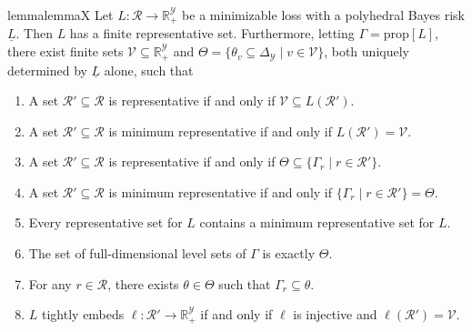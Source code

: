 \documentclass[twoside,11pt]{article}
\newcommand{\reals}{\mathbb{R}}
\newcommand{\prop}[1]{\mathrm{prop}[#1]}
\newcommand{\simplex}{\Delta_\Y}
\newcommand{\R}{\mathcal{R}}
\newcommand{\V}{\mathcal{V}}
\newcommand{\Y}{\mathcal{Y}}
\newcommand{\risk}[1]{\underline{#1}}
\begin{document}
\begin{restatable}{lemma}{lemmaX}\label{lem:X}
  Let $L: \R \to \reals^\Y_+$ be a minimizable loss with a polyhedral Bayes risk $\risk L$.
  Then $L$ has a finite representative set.
  Furthermore, letting $\Gamma = \prop{L}$, there exist finite sets
  $\V \subseteq \reals^\Y_+$ and
  $\Theta = \{\theta_v \subseteq \simplex \mid v\in\V\}$,
  both uniquely determined by $\risk{L}$ alone,
  such that
  \begin{enumerate}
  \item A set $\R'\subseteq\R$ is representative if and only if $\V \subseteq L(\R')$.\label{item:X-rep-V}
  \item A set $\R'\subseteq\R$ is minimum representative if and only if $L(\R') = \V$.\label{item:X-min-V}
  \item A set $\R'\subseteq\R$ is representative if and only if $\Theta \subseteq \{\Gamma_r \mid r \in \R'\}$.\label{item:X-rep-Theta}
  \item A set $\R'\subseteq\R$ is minimum representative if and only if $\{\Gamma_r \mid r \in \R'\} = \Theta$.\label{item:X-min-Theta}
  \item Every representative set for $L$ contains a minimum representative set for $L$.\label{item:X-rep-contain-min}
  \item The set of full-dimensional level sets of $\Gamma$ is exactly $\Theta$.\label{item:X-full-dim}
  \item For any $r \in \R$, there exists $\theta \in \Theta$ such that $\Gamma_r \subseteq \theta$.\label{item:X-redundant}
  \item $L$ tightly embeds $\ell:\R'\to\reals^\Y_+$ if and only if $\ell$ is injective and $\ell(\R') = \V$.\label{item:X-tight-embed}
  \end{enumerate}
\end{restatable}
\end{document}
